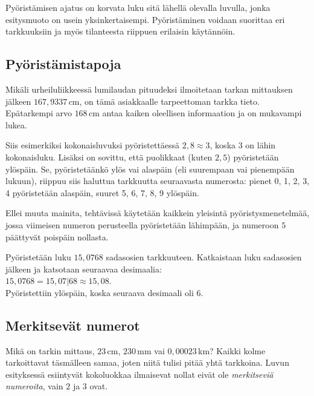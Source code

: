 Pyöristämisen ajatus on korvata luku sitä lähellä olevalla luvulla, jonka esitysmuoto on usein yksinkertaisempi. Pyöristäminen voidaan suorittaa eri tarkkuuksiin ja myös tilanteesta riippuen erilaisin käytännöin.%

\subsection{Pyöristämistapoja}


\begin{esimerkki}
Mikäli urheiluliikkeessä lumilaudan pituudeksi ilmoitetaan tarkan mittauksen jälkeen $167,9337$\,cm, on tämä asiakkaalle tarpeettoman tarkka tieto. Epätarkempi arvo $168$\,cm antaa kaiken oleellisen informaation ja on mukavampi lukea.
\end{esimerkki}



Siis esimerkiksi kokonaisluvuksi pyöristettäessä $2,8 \approx 3$, koska $3$ on lähin kokonaisluku. Lisäksi on sovittu, että puolikkaat (kuten $2,5$) pyöristetään ylöspäin. Se, pyöristetäänkö ylös vai alaspäin (eli suurempaan vai pienempään lukuun), riippuu siis haluttua tarkkuutta seuraavasta numerosta: pienet 0, 1, 2, 3, 4 pyöristetään alaspäin, suuret 5, 6, 7, 8, 9 ylöspäin.

Ellei muuta mainita, tehtävissä käytetään kaikkein yleisintä pyöristysmenetelmää, jossa viimeisen numeron perusteella pyöristetään lähimpään, ja numeroon $5$ päättyvät poispäin nollasta.

\begin{esimerkki}
Pyöristetään luku $15,0768$ sadasosien tarkkuuteen. Katkaistaan luku sadasosien jälkeen ja katsotaan seuraavaa desimaalia:\\
$15,0768 = 15,07|68 \approx 15,08$.\\ %
Pyöristettiin ylöspäin, koska seuraava desimaali oli 6.
\end{esimerkki}


\subsection{Merkitsevät numerot}

Mikä on tarkin mittaus, $23$\,cm, $230$\,mm vai $0,00023$\,km? Kaikki kolme tarkoittavat täsmälleen samaa, joten niitä tulisi pitää yhtä tarkkoina. Luvun esityksessä esiintyvät kokoluokkaa ilmaisevat nollat eivät ole \emph{merkitseviä numeroita}, vain $2$ ja $3$ ovat.

